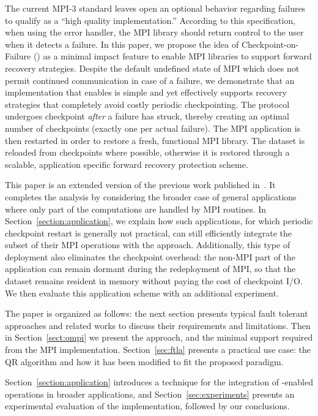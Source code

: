 The current MPI-3 standard leaves open an optional behavior regarding failures to qualify
as a ``high quality implementation.'' According to
this specification, when using the  error handler,
the MPI library should return control to the user when it detects a
failure. In this paper, we propose the idea of Checkpoint-on-Failure (\cof) as
a minimal impact feature to enable MPI libraries to support
forward recovery strategies. Despite the default undefined state of 
MPI which does not permit continued communication in case of a failure, 
we demonstrate that an implementation that
enables \cof is simple and yet effectively supports \abft recovery
strategies that completely avoid costly periodic checkpointing.
The \cof protocol undergoes checkpoint \emph{after} a failure has struck,
thereby creating an optimal number of checkpoints (exactly one per 
actual failure). The MPI application is then restarted in order to 
restore a fresh, functional MPI library. The dataset is reloaded from 
checkpoints where possible, otherwise it is restored through a scalable,
application specific forward recovery protection scheme.

This paper is an extended version of the previous work published
in~\cite{europar12:cof}. It completes the analysis by considering the
broader case of general applications where only part of the computations
are handled by MPI routines. In Section~\ref{section:application}, we
explain how such applications, for which periodic checkpoint restart is
generally not practical, can still efficiently integrate the subset of
their MPI operations with the \cof approach. Additionally, this type of
deployment also eliminates the checkpoint overhead: the non-MPI part of the application can
remain dormant during the redeployment of MPI, so that the dataset
remains resident in memory without paying the cost of checkpoint I/O. We then
evaluate this application scheme with an additional experiment. 

The paper is organized as follows: the next section presents typical
fault tolerant approaches and related works to discuss their
requirements and limitations. Then in Section~\ref{sect:ompi} we
present the \cof approach, and the minimal support required from the
MPI implementation.  Section~\ref{sec:ftla} presents a practical use
case: the \abft QR algorithm and how it has been modified to fit the
proposed paradigm.
\begin{comment}
Section~\ref{sec:model} presents a performance model to assess the
efficiency of both periodic checkpointing with rollback recovery and On-Demand
Checkpointing, and
\end{comment}
Section~\ref{section:application} introduces a technique for
the integration of \cof-enabled operations in broader applications, and
Section~\ref{sec:experiments} presents an experimental
evaluation of the implementation, followed by our conclusions.


